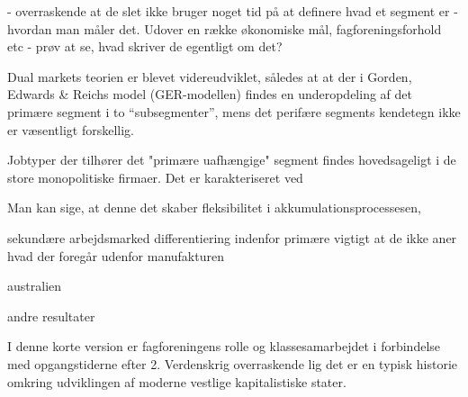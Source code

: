 - overraskende at de slet ikke bruger noget tid på at definere hvad et segment er - hvordan man måler det. Udover en række økonomiske mål, fagforeningsforhold etc - prøv at se, hvad skriver de egentligt om det?


Dual markets teorien er blevet videreudviklet, således at at der i Gorden, Edwards \& Reichs model (GER-modellen) findes en underopdeling af det primære segment i to “subsegmenter”, mens det perifære segments kendetegn ikke er væsentligt forskellig. 



Jobtyper der tilhører det "primære uafhængige" segment findes hovedsageligt i de store monopolitiske firmaer. Det er karakteriseret ved 








 Man kan sige,  at denne det skaber fleksibilitet i akkumulationsprocessesen,  




sekundære arbejdsmarked
differentiering indenfor primære
vigtigt at de ikke aner hvad der foregår udenfor manufakturen

australien

andre resultater


 

I denne korte version er fagforeningens rolle og klassesamarbejdet i forbindelse med opgangstiderne efter 2. Verdenskrig overraskende lig  det er en typisk historie omkring udviklingen af moderne vestlige kapitalistiske stater. 

















